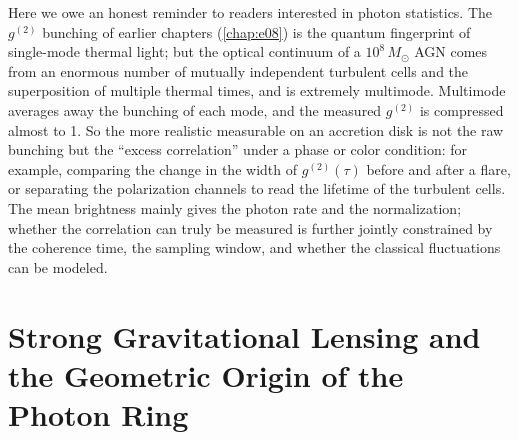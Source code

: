 Here we owe an honest reminder to readers interested in photon statistics. The \(g^{(2)}\) bunching of earlier chapters (\ref{chap:e08}) is the quantum fingerprint of single-mode thermal light; but the optical continuum of a \(10^8\,M_\odot\) AGN comes from an enormous number of mutually independent turbulent cells and the superposition of multiple thermal times, and is extremely multimode. Multimode averages away the bunching of each mode, and the measured \(g^{(2)}\) is compressed almost to 1. So the more realistic measurable on an accretion disk is not the raw bunching but the ``excess correlation'' under a phase or color condition: for example, comparing the change in the width of \(g^{(2)}(\tau)\) before and after a flare, or separating the polarization channels to read the lifetime of the turbulent cells. The mean brightness mainly gives the photon rate and the normalization; whether the correlation can truly be measured is further jointly constrained by the coherence time, the sampling window, and whether the classical fluctuations can be modeled.

\section{Strong Gravitational Lensing and the Geometric Origin of the Photon Ring}
\label{sec:e19-geometry}

